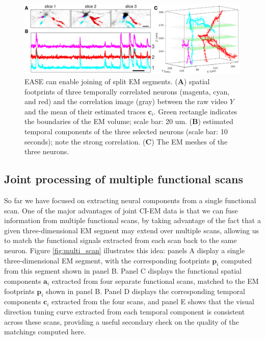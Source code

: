 \documentclass[10pt,letterpaper]{article}
\begin{document}
{\begin{figure}[t!]
\centering
\includegraphics[width=1\textwidth]{Figs/fig_example_merge.pdf}
\caption{EASE can enable joining of split EM segments. (\textbf{A}) spatial footprints of three temporally correlated neurons (magenta, cyan, and red) and the correlation image (gray) between the raw video $Y$ and the mean of their estimated traces $\bm{c}_i$. Green rectangle indicates the boundaries of the EM volume; scale bar: 20 um. (\textbf{B}) estimated temporal components of the three selected neurons (scale bar: 10 seconds); note the strong correlation. (\textbf{C}) The EM meshes of the three neurons. } \label{fig:merge}
\end{figure}



\subsection{Joint processing of multiple functional scans}

So far we have focused on extracting neural components from a single functional scan.  One of the major advantages of joint CI-EM data is that we can fuse information from multiple functional scans, by taking advantage of the fact that a given three-dimensional EM segment may extend over multiple scans, allowing us to match the functional signals extracted from each scan back to the same neuron.  Figure \ref{fig:multi_scan} illustrates this idea: panels A display a single three-dimensional EM segment, with the corresponding footprints $\bm{p}_i$ computed from this segment shown in panel B.  Panel C displays the functional spatial components $\bm{a}_i$ extracted from four separate functional scans, matched to the EM footprints $\bm{p}_i$ shown in panel B.  Panel D displays the corresponding temporal components $\bm{c}_i$ extracted from the four scans, and panel E shows that the visual direction tuning curve extracted from each temporal component is consistent across these scans, providing a useful secondary check on the quality of the matchings computed here.

}
\end{document}
